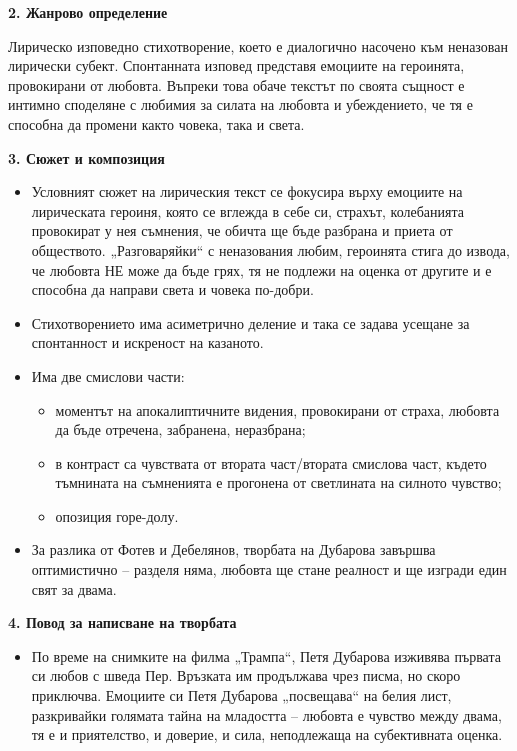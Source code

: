 \documentclass[12pt,a4paper]{article}
\begin{document}
\vspace{0.1cm}
 
\noindent 
\textbf{2. Жанрово определение}
\vspace{0.1cm}
 
\indent Лирическо изповедно стихотворение, което е диалогично насочено към неназован лирически субект. Спонтанната изповед представя емоциите на героинята, провокирани от любовта. Въпреки това обаче текстът по своята същност е интимно споделяне с любимия за силата на любовта и убеждението, че тя е способна да промени както човека, така и света.

\vspace{0.1cm}
\noindent
\textbf{3. Сюжет и композиция}
\begin{itemize}[leftmargin=*, noitemsep, topsep=2pt, parsep=0pt]
    \item Условният сюжет на лирическия текст се фокусира върху емоциите на лирическата героиня, която се вглежда в себе си, страхът, колебанията провокират у нея съмнения, че обичта ще бъде разбрана и приета от обществото. „Разговаряйки“ с неназования любим, героинята стига до извода, че любовта НЕ може да бъде грях, тя не подлежи на оценка от другите и е способна да направи света и човека по-добри.
    \item Стихотворението има асиметрично деление и така се задава усещане за спонтанност и искреност на казаното.
    \item Има две смислови части:
    \begin{itemize}[leftmargin=*]
        \item моментът на апокалиптичните видения, провокирани от страха, любовта да бъде отречена, забранена, неразбрана;
        \item в контраст са чувствата от втората част/втората смислова част, където тъмнината на съмненията е прогонена от светлината на силното чувство;
        \item опозиция горе-долу.
    \end{itemize}
    \item За разлика от Фотев и Дебелянов, творбата на Дубарова завършва оптимистично – разделя няма, любовта ще стане реалност и ще изгради един свят за двама.
\end{itemize}

\vspace{0.1cm}
 
\noindent 
\textbf{4. Повод за написване на творбата}
\begin{itemize}[leftmargin=*]
\vspace{-0.2cm}
\item По време на снимките на филма „Трампа“, Петя Дубарова изживява първата си любов с шведа Пер. Връзката им продължава чрез писма, но скоро приключва. Емоциите си Петя Дубарова „посвещава“ на белия лист, разкривайки голямата тайна на младостта – любовта е чувство между двама, тя е и приятелство, и доверие, и сила, неподлежаща на субективната оценка.
\end{itemize}
\end{document}
